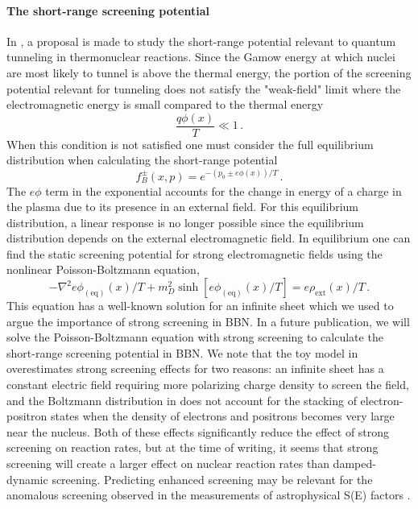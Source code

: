 \paragraph{The short-range screening potential}
In \cite{Grayson:2023flr}, a proposal is made to study the short-range potential relevant to quantum tunneling in thermonuclear reactions. Since the Gamow energy at which nuclei are most likely to tunnel is above the thermal energy, the portion of the screening potential relevant for tunneling does not satisfy the "weak-field" limit where the electromagnetic energy is small compared to the thermal energy
\begin{equation}
 \frac{q \phi(x)}{T} \ll 1\,.
\end{equation}
When this condition is not satisfied one must consider the full equilibrium distribution when calculating the short-range potential \cite{Hakim:1967prd,DeGroot:1980dk}
\begin{equation}\label{eq:Boltz}
 f_B^\pm(x,p) = e^{-(p_0\pm e\phi(x))/T}\,.
\end{equation}
The $e\phi$ term in the exponential accounts for the change in energy of a charge in the plasma due to its presence in an external field. For this equilibrium distribution, a linear response is no longer possible since the equilibrium distribution depends on the external electromagnetic field. In equilibrium one can find the static screening potential for strong electromagnetic fields using the nonlinear Poisson-Boltzmann equation,
\begin{equation}\label{eq:Poisson-Boltz}
 -\nabla^2 e\phi_{(\text{eq})}(x)/T +m_D^2\sinh\left[e\phi_{(\text{eq})}(x)/T\right] =e\rho_\mathrm{ext}(x)/T\,.
 \end{equation}
This equation has a well-known solution for an infinite sheet which we used to argue the importance of strong screening in BBN. 
In a future publication, we will solve the Poisson-Boltzmann equation with strong screening to calculate the short-range screening potential in BBN. We note that the toy model in \cite{Grayson:2023flr} overestimates strong screening effects for two reasons: an infinite sheet has a constant electric field requiring more polarizing charge density to screen the field, and the Boltzmann distribution in  does not account for the stacking of electron-positron states when the density of electrons and positrons becomes very large near the nucleus. Both of these effects significantly reduce the effect of strong screening on reaction rates, but at the time of writing, it seems that strong screening will create a larger effect on nuclear reaction rates than damped-dynamic screening. Predicting enhanced screening may be relevant for the anomalous screening observed in the measurements of astrophysical S(E) factors \cite{Zhang:2020nuc}.

